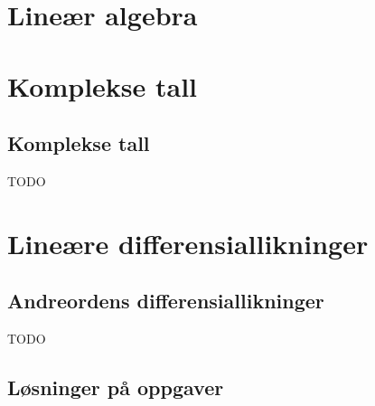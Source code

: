 
\newcommand{\kapittel}[2]{\chapter{#2}}
\newcommand{\kapittelslutt}{}
\renewcommand{\kapittelemnenavn}{}



\def\inkludert{1}


\setlength{\cftpartnumwidth}{3em}

\frontmatter
\tableofcontents*


\mainmatter
\part{Lineær algebra}













\part{Komplekse tall}

\chapter{Komplekse tall}

TODO

\part{Lineære differensiallikninger}

\chapter{Andreordens differensiallikninger}

TODO


\backmatter

\chapter{Løsninger på oppgaver}










